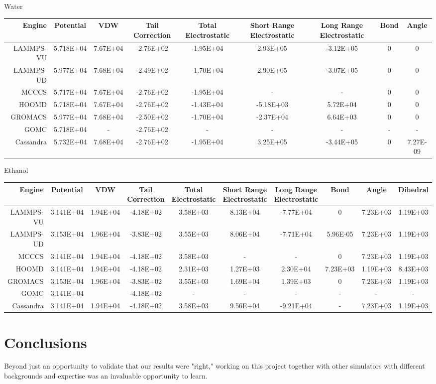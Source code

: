 Water 
\begin{table}[]
\begin{tabular}{rcccccccc}
Engine & Potential & VDW & Tail Correction & Total Electrostatic & Short Range Electrostatic & Long Range Electrostatic & Bond & Angle \\ \hline
LAMMPS-VU & 5.718E+04 & 7.67E+04 & -2.76E+02 & -1.95E+04 & 2.93E+05 & -3.12E+05 & 0 & 0 \\
LAMMPS-UD & 5.977E+04 & 7.68E+04 & -2.49E+02 & -1.70E+04 & 2.90E+05 & -3.07E+05 & 0 & 0 \\
MCCCS & 5.717E+04 & 7.67E+04 & -2.76E+02 & -1.95E+04 & - & - & 0 & 0 \\
HOOMD & 5.718E+04 & 7.67E+04 & -2.76E+02 & -1.43E+04 & -5.18E+03 & 5.72E+04 & 0 & 0 \\
GROMACS & 5.977E+04 & 7.68E+04 & -2.50E+02 & -1.70E+04 & -2.37E+04 & 6.64E+03 & 0 & 0 \\
GOMC & 5.718E+04 & - & -2.76E+02 & - & - & - & - & - \\
Cassandra & 5.732E+04 & 7.68E+04 & -2.76E+02 & -1.95E+04 & 3.25E+05 & -3.44E+05 & 0 & 7.27E-09
\end{tabular}
\end{table}

Ethanol
\begin{table}[]
\begin{tabular}{rccccccccc}
Engine & Potential & VDW & Tail Correction & Total Electrostatic & Short Range Electrostatic & Long Range Electrostatic & Bond & Angle & Dihedral \\ \hline
LAMMPS-VU & 3.141E+04 & 1.94E+04 & -4.18E+02 & 3.58E+03 & 8.13E+04 & -7.77E+04 & 0 & 7.23E+03 & 1.19E+03 \\
LAMMPS-UD & 3.153E+04 & 1.96E+04 & -3.83E+02 & 3.55E+03 & 8.06E+04 & -7.71E+04 & 5.96E-05 & 7.23E+03 & 1.19E+03 \\
MCCCS & 3.141E+04 & 1.94E+04 & -4.18E+02 & 3.58E+03 & - & - & 0 & 7.23E+03 & 1.19E+03 \\
HOOMD & 3.141E+04 & 1.94E+04 & -4.18E+02 & 2.31E+03 & 1.27E+03 & 2.30E+04 & 7.23E+03 & 1.19E+03 & 8.43E+03 \\
GROMACS & 3.153E+04 & 1.96E+04 & -3.83E+02 & 3.55E+03 & 1.69E+04 & 1.39E+03 & 0 & 7.23E+03 & 1.19E+03 \\
GOMC & 3.141E+04 &  & -4.18E+02 & - & - & - & - & - & - \\
Cassandra & 3.141E+04 & 1.94E+04 & -4.18E+02 & 3.58E+03 & 9.56E+04 & -9.21E+04 & - & 7.23E+03 & 1.19E+03
\end{tabular}
\end{table}


\section{Conclusions}
Beyond just an opportunity to validate that our results were "right," working on this project together with other simulators with different backgrounds and expertise was an invaluable opportunity to learn.


